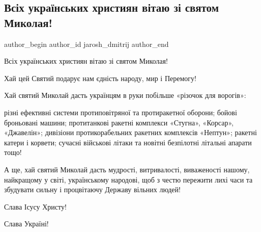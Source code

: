  
 
 
 
 
 
\subsection{Всіх українських християн вітаю зі святом Миколая!}
\label{sec:19_12_2021.fb.jarosh_dmitrij.1.svjatoj_nikolaj}
 
\ifcmt
 author_begin
   author_id jarosh_dmitrij
 author_end
\fi

Всіх українських християн вітаю зі святом Миколая!

Хай цей Святий подарує нам єдність народу, мир і Перемогу!

Хай святий Миколай дасть українцям в руки побільше «різочок для ворогів»:

різні ефективні системи протиповітряної та протиракетної оборони; бойові
броньовані машини; протитанкові ракетні комплекси «Стугна», «Корсар»,
«Джавелін»; дивізіони протикорабельних ракетних комплексів «Нептун»; ракетні
катери і корвети; сучасні військові літаки та новітні безпілотні літальні
апарати тощо!

А ще, хай святий Миколай дасть мудрості, витривалості, виваженості нашому,
найкращому у світі, українському народові, щоб з честю пережити лихі часи та
збудувати сильну і процвітаючу Державу вільних людей!

Слава Ісусу Христу!

Слава Україні!

